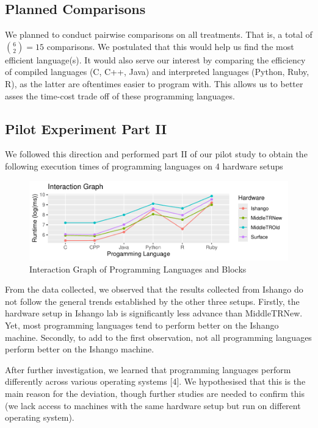 \documentclass[12pt,halfline,a4paper,]{ouparticle}
\begin{document}
\subsection{Planned Comparisons}\label{planned-comparisons}

We planned to conduct pairwise comparisons on all treatments. That is, a
total of \({6 \choose 2} = 15\) comparisons. We postulated that this
would help us find the most efficient language(s). It would also serve
our interest by comparing the efficiency of compiled languages (C, C++,
Java) and interpreted languages (Python, Ruby, R), as the latter are
oftentimes easier to program with. This allows us to better asses the
time-cost trade off of these programming languages.

\subsection{Pilot Experiment Part II}\label{pilot-experiment-part-ii}

We followed this direction and performed part II of our pilot study to
obtain the following execution times of programming languages on 4
hardware setups

\begin{figure}[H]
\includegraphics[width=1\linewidth]{final_files/figure-latex/figPilot-1} \caption{Interaction Graph of Programming Languages and Blocks}\label{fig:figPilot}
\end{figure}

From the data collected, we observed that the results collected from
Ishango do not follow the general trends established by the other three
setups. Firstly, the hardware setup in Ishango lab is significantly less
advance than MiddleTRNew. Yet, most programming languages tend to
perform better on the Ishango machine. Secondly, to add to the first
observation, not all programming languages perform better on the Ishango
machine.

After further investigation, we learned that programming languages
perform differently across various operating systems {[}4{]}. We
hypothesised that this is the main reason for the deviation, though
further studies are needed to confirm this (we lack access to machines
with the same hardware setup but run on different operating system).
\end{document}
